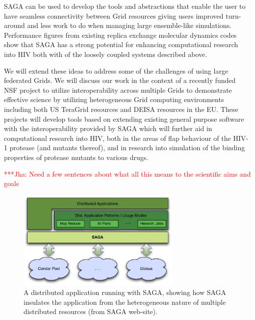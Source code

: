 \documentclass[a4paper,10pt,twocolumn]{article}
\newcommand{\jhanote}[1]{ {\textcolor{red} { ***Jha: #1 }}}
\newcommand{\jhanote}[1]{}
\begin{document}


SAGA can be used to develop the tools and abstractions that enable the user to have seamless connectivity between Grid resources giving users improved turn-around and less work to do when managing large ensemble-like simulations.  Performance figures from existing replica exchange molecular dynamics codes show that SAGA has a strong potential for enhancing computational research into HIV both with of the loosely coupled systems described above.

We will extend these ideas to address some of the challenges of using large federated Grids. We will discuss our work in the context of a recently funded NSF project to utilize interoperability across multiple Grids to demonstrate effective science by utilizing heterogeneous Grid computing environments including both US TeraGrid resources and DEISA resources in the EU.  These projects will develop tools based on extending existing general purpose software with the interoperability provided by SAGA which will further aid in computational research into HIV, both in the areas of flap behaviour of the HIV-1 protease (and mutants thereof), and in research into simulation of the binding properties of protease mutants to various drugs.

\jhanote{Need a few sentences about what all this means to the scientific aims and goals}

\thispagestyle{plain}
\newpage
\begin{figure}
\centering	
\includegraphics[width=8cm]{sagadistributedappslarge}
\caption{A distributed application running with SAGA, showing how SAGA insulates the application from the heterogeneous nature of multiple distributed resources (from SAGA web-site).}
\end{figure}
\end{document}
